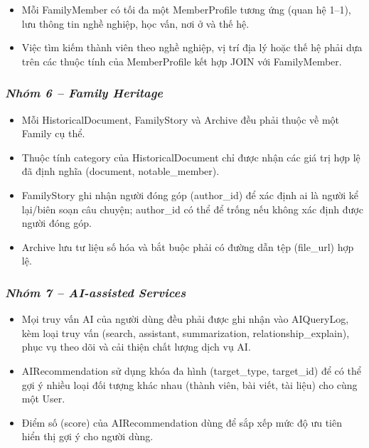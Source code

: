 \begin{itemize}
\item
  Mỗi FamilyMember có tối đa một MemberProfile tương ứng (quan hệ 1--1), lưu thông tin nghề nghiệp, học vấn, nơi ở và thế hệ.
\item
  Việc tìm kiếm thành viên theo nghề nghiệp, vị trí địa lý hoặc thế hệ phải dựa trên các thuộc tính của MemberProfile kết hợp JOIN với FamilyMember.
\end{itemize}

\hypertarget{nhuxf3m-6-family-heritage}{%
\subsubsection{\texorpdfstring{\emph{\textbf{Nhóm 6 -- Family Heritage}}}{Nhóm 6 -- Family Heritage}}\label{nhuxf3m-6-family-heritage}}

\begin{itemize}
\item
  Mỗi HistoricalDocument, FamilyStory và Archive đều phải thuộc về một Family cụ thể.
\item
  Thuộc tính category của HistoricalDocument chỉ được nhận các giá trị hợp lệ đã định nghĩa (document, notable\_member).
\item
  FamilyStory ghi nhận người đóng góp (author\_id) để xác định ai là người kể lại/biên soạn câu chuyện; author\_id có thể để trống nếu không xác định được người đóng góp.
\item
  Archive lưu tư liệu số hóa và bắt buộc phải có đường dẫn tệp (file\_url) hợp lệ.
\end{itemize}

\hypertarget{nhuxf3m-7-ai-assisted-services}{%
\subsubsection{\texorpdfstring{\emph{\textbf{Nhóm 7 -- AI-assisted Services}}}{Nhóm 7 -- AI-assisted Services}}\label{nhuxf3m-7-ai-assisted-services}}

\begin{itemize}
\item
  Mọi truy vấn AI của người dùng đều phải được ghi nhận vào AIQueryLog, kèm loại truy vấn (search, assistant, summarization, relationship\_explain), phục vụ theo dõi và cải thiện chất lượng dịch vụ AI.
\item
  AIRecommendation sử dụng khóa đa hình (target\_type, target\_id) để có thể gợi ý nhiều loại đối tượng khác nhau (thành viên, bài viết, tài liệu) cho cùng một User.
\item
  Điểm số (score) của AIRecommendation dùng để sắp xếp mức độ ưu tiên hiển thị gợi ý cho người dùng.
\end{itemize}

